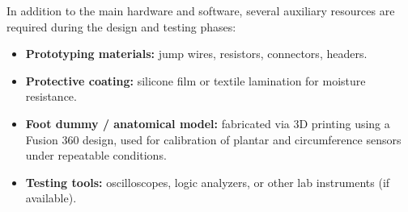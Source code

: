 In addition to the main hardware and software, several auxiliary resources are required during the design and testing phases:
\begin{itemize}[leftmargin=1.5cm]
    \item \textbf{Prototyping materials:} jump wires, resistors, connectors, headers.
    \item \textbf{Protective coating:} silicone film or textile lamination for moisture resistance.
    \item \textbf{Foot dummy / anatomical model:} fabricated via 3D printing using a Fusion 360 design, used for calibration of plantar and circumference sensors under repeatable conditions.
    \item \textbf{Testing tools:} oscilloscopes, logic analyzers, or other lab instruments (if available).
\end{itemize}



